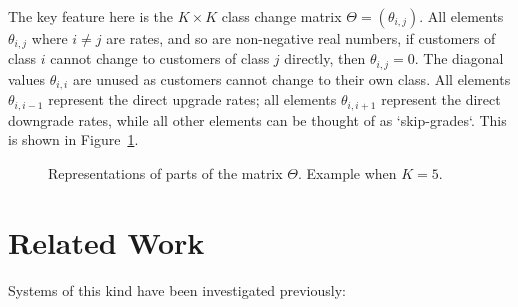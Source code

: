 \documentclass{article}
\begin{document}
The key feature here is the $K \times K$ class change matrix
$\Theta = (\theta_{i,j})$. All elements $\theta_{i,j}$ where $i \neq j$ are
rates, and so are non-negative real numbers, if customers of class $i$ cannot
change to customers of class $j$ directly, then $\theta_{i,j} = 0$. The diagonal
values $\theta_{i,i}$ are unused as customers cannot change to their own class.
All elements $\theta_{i,i-1}$ represent the direct upgrade rates; all elements
$\theta_{i,i+1}$ represent the direct downgrade rates, while all other elements
can be thought of as `skip-grades`.
This is shown in Figure~\ref{fig:skipgrades}.

\begin{figure}
\begin{center}

\end{center}
\caption{Representations of parts of the matrix $\Theta$. Example when $K=5$.}
\label{fig:skipgrades}
\end{figure}




\section{Related Work}\label{sec:related}
Systems of this kind have been investigated previously:
\end{document}
